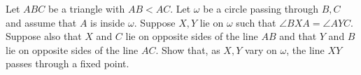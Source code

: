 Let $ABC$ be a triangle with $AB<AC$. Let $\omega$ be a circle passing through $B, C$ and assume that $A$ is inside $\omega$. Suppose $X, Y$ lie on $\omega$ such that $\angle BXA=\angle AYC$. Suppose also that $X$ and $C$ lie on opposite sides of the line $AB$ and that $Y$ and $B$ lie on opposite sides of the line $AC$. Show that, as $X, Y$ vary on $\omega$, the line $XY$ passes through a fixed point.